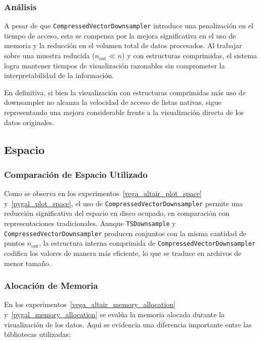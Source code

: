 \subsubsection{Análisis}

A pesar de que \texttt{CompressedVectorDownsampler} introduce una penalización en el tiempo de acceso, esta se compensa por la mejora significativa en el uso de memoria y la reducción en el volumen total de datos procesados. Al trabajar sobre una muestra reducida (\(n_{\text{out}} \ll n\)) y con estructuras comprimidas, el sistema logra mantener tiempos de visualización razonables sin comprometer la interpretabilidad de la información.

En definitiva, si bien la visualización con estructuras comprimidas más uso de downsampler no alcanza la velocidad de acceso de listas nativas, sigue representando una mejora considerable frente a la visualización directa de los datos originales. 

\subsection{Espacio}

\subsubsection{Comparación de Espacio Utilizado}

Como se observa en los experimentos~\ref{vega_altair_plot_space} y~\ref{pygal_plot_space}, el uso de \texttt{CompressedVectorDownsampler} permite una reducción significativa del espacio en disco ocupado, en comparación con representaciones tradicionales. Aunque \texttt{TSDownsample} y \texttt{CompressedVectorDownsampler} producen conjuntos con la misma cantidad de puntos \(n_{\text{out}}\), la estructura interna comprimida de \texttt{CompressedVectorDownsampler} codifica los valores de manera más eficiente, lo que se traduce en archivos de menor tamaño. 

\subsubsection{Alocación de Memoria}

En los experimentos~\ref{vega_altair_memory_allocation} y~\ref{pygal_memory_allocation} se evalúa la memoria alocada durante la visualización de los datos. Aquí se evidencia una diferencia importante entre las bibliotecas utilizadas:

